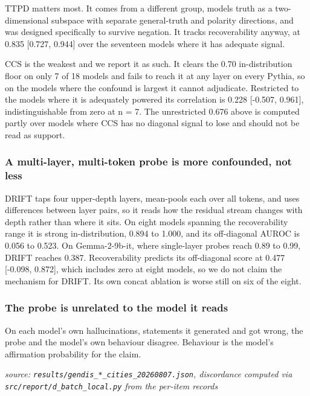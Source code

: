 \documentclass[10pt]{article}
\begin{document}
TTPD matters most. It comes from a different group, models truth as a two-dimensional subspace with separate general-truth and polarity directions, and was designed specifically to survive negation. It tracks recoverability anyway, at 0.835 [0.727, 0.944] over the seventeen models where it has adequate signal.

CCS is the weakest and we report it as such. It clears the 0.70 in-distribution floor on only 7 of 18 models and fails to reach it at any layer on every Pythia, so on the models where the confound is largest it cannot adjudicate. Restricted to the models where it is adequately powered its correlation is 0.228 [-0.507, 0.961], indistinguishable from zero at n = 7. The unrestricted 0.676 above is computed partly over models where CCS has no diagonal signal to lose and should not be read as support.

\subsubsection{A multi-layer, multi-token probe is more confounded, not less}

DRIFT \citep{hussain2026parallax} taps four upper-depth layers, mean-pools each over all tokens, and uses differences between layer pairs, so it reads how the residual stream changes with depth rather than where it sits. On eight models spanning the recoverability range it is strong in-distribution, 0.894 to 1.000, and its off-diagonal AUROC is 0.056 to 0.523. On Gemma-2-9b-it, where single-layer probes reach 0.89 to 0.99, DRIFT reaches 0.387. Recoverability predicts its off-diagonal score at 0.477 [-0.098, 0.872], which includes zero at eight models, so we do not claim the mechanism for DRIFT. Its own concat ablation is worse still on six of the eight.

\subsubsection{The probe is unrelated to the model it reads}

On each model's own hallucinations, statements it generated and got wrong, the probe and the model's own behaviour disagree. Behaviour is the model's affirmation probability for the claim.

{\footnotesize\raggedright\sloppy \emph{source: \texttt{results/gendis\_*\_cities\_20260807.json}, discordance computed via \texttt{src/report/d\_batch\_local.py} from the per-item records}\par}
\end{document}
